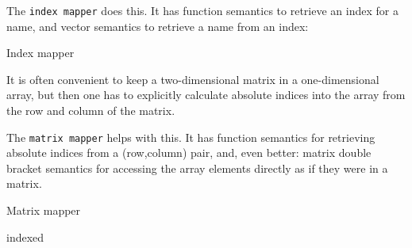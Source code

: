 The {\tt index mapper} does this.
It has function semantics to retrieve an index for a name,
and vector semantics to retrieve a name from an index:
\begin{algorithm}{Index mapper}
\end{algorithm}

It is often convenient to keep a two-dimensional matrix in a one-dimensional
array, but then one has to explicitly calculate absolute indices into the
array from the row and column of the matrix.

The {\tt matrix mapper} helps with this.
It has function semantics for retrieving absolute indices from a (row,column)
pair, and, even better: matrix double bracket semantics for accessing the
array elements directly as if they were in a matrix.
\begin{algorithm}{Matrix mapper}
\end{algorithm}

\begin{algorithm}{indexed}
\end{algorithm}


\begin{sourceslandscape}
\end{sourceslandscape}
